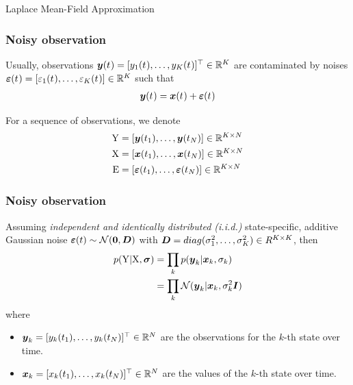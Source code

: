 \begin{frame}
    \begin{center}
        {\large Laplace Mean-Field Approximation}
    \end{center}        
\end{frame}

\begin{frame}[t]
    \frametitle{Noisy observation}
    Usually, observations $\boldsymbol{y}(t_{}) = [y_{1}(t_{}),\dots,y_{K}(t_{})]^\top \in \mathbb{R}^{K}$ are contaminated by noises $\boldsymbol{\varepsilon}(t_{}) = [\varepsilon_1(t_{}),\dots,\varepsilon_K(t_{})] \in \mathbb{R}^{K}$ such that
    \begin{align}
        \boldsymbol{y}(t_{}) = \boldsymbol{x}(t_{}) + \boldsymbol{\varepsilon}(t_{})        
    \end{align}
    
    \vspace{\baselineskip}
    For a sequence of observations, we denote
    \begin{align}
        \mathrm{Y} & = [\boldsymbol{y}(t_{1}),\dots,\boldsymbol{y}(t_{N})] \in \mathbb{R}^{K \times N}
        \nonumber
        \\
        \mathrm{X} & = [\boldsymbol{x}(t_{1}),\dots,\boldsymbol{x}(t_{N})] \in \mathbb{R}^{K \times N}
        \nonumber
        \\
        \mathrm{E} & = [\boldsymbol{\varepsilon}(t_{1}),\dots,\boldsymbol{\varepsilon}(t_{N})] \in \mathbb{R}^{K \times N}
        \nonumber
    \end{align}
\end{frame}

\begin{frame}[t]
    \frametitle{Noisy observation}
    Assuming \emph{independent and identically distributed (i.i.d.)} state-specific, additive Gaussian noise $\boldsymbol{\varepsilon}{(t)} \sim \mathcal{N}(\boldsymbol{0}, \boldsymbol{D})$ with $\boldsymbol{D} = diag(\sigma_{1}^2,\dots,\sigma_{K}^2) \in R^{K \times K}$, then
    \begin{align}        
        p(\mathrm{Y}\vert\mathrm{X},\boldsymbol{\sigma}) 
        & = \prod_k{
            p(\boldsymbol{y}_{k}\vert\boldsymbol{x}_{k},\sigma_{k})
        }
        \nonumber
        \\
        & = \prod_k{
            \mathcal{N}(\boldsymbol{y}_{k}\vert\boldsymbol{x}_{k}, \sigma_{k}^2\boldsymbol{I})
        }
        \label{eq-ode-noise-model} 
    \end{align}
    where 
    \begin{itemize}    	
    	\item[] $\boldsymbol{y}_{k} = [y_{k}(t_{1}),\dots,y_{k}(t_{N})]^\top \in \mathbb{R}^N$ are the observations for the $k$-th state over time.
        \item[] $\boldsymbol{x}_{k} = [x_{k}(t_{1}),\dots,x_{k}(t_{N})]^\top \in \mathbb{R}^N$ are the values of the $k$-th state over time.
    \end{itemize}
\end{frame}

